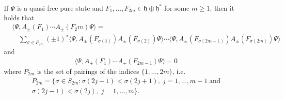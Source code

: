 \begin{theorem}
	\label{thm:wicks}
	If $\Psi$ is a quasi-free pure state and $F_1,\ldots,F_{2m}\in\mathfrak{h}\oplus\mathfrak{h}^*$
	for some $m\geq1$, then it holds that
	\begin{align}
		\label{wicks-theorem}
		&\langle\Psi,A_\pm(F_1)\cdots A_\pm(F_2m)\Psi\rangle =\nonumber\\
		&\quad\sum_{\sigma\in P_{2m}} (\pm 1)^\sigma
		\langle\Psi, A_\pm(F_{\sigma(1)})A_\pm(F_{\sigma(2)})\Psi\rangle \cdots
		\langle\Psi, A_\pm(F_{\sigma(2m-1)})A_\pm(F_{\sigma(2m)})\Psi\rangle
	\end{align}
	and
	\begin{align*}
		\langle\Psi,A_\pm(F_1)\cdots A_\pm(F_{2m-1})\Psi\rangle = 0
	\end{align*}
	where $P_{2m}$ is the set of pairings of the indices $\{1,\ldots,2m\}$, i.e.
	\begin{align*}
		P_{2m} = \{
			\sigma\in S_{2m} : \sigma(2j-1) < \sigma(2j+1),\; j=1,\ldots,m-1\;\mathrm{and}\\
			\sigma(2j-1) < \sigma(2j),\; j=1,\ldots,m
		\}.
	\end{align*}
\end{theorem}
